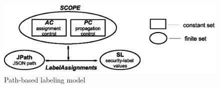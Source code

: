  
 	\begin{figure}[t]
 		\centering
 		\includegraphics[width=1\textwidth]{NSS16/path-labeling-model}
 		\caption{Path-based labeling model}
 		\label{fig:path-based-labeling}
 	\end{figure}
 